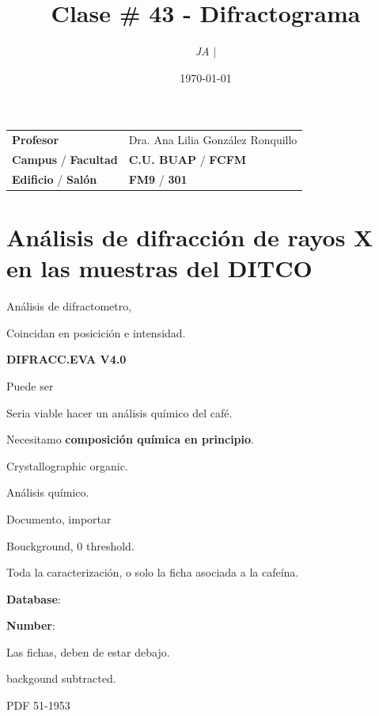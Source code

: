 \documentclass{article}
\title{Clase \# 43 - Difractograma}
\author{\emph{JA} $\boldsymbol{\mid}$}
\date{\today}
\begin{document}
\maketitle



\begin{mybox}
\noindent\begin{tabular}{@{}ll}
	{\bfseries{Profesor}} & Dra. Ana Lilia González Ronquillo\\
	\textcolor{prussianblue}{\bfseries{Campus}} / \textcolor{trueblue}{\bfseries{Facultad}}  & \textcolor{prussianblue}{\bfseries{C.U. BUAP}} /  \textcolor{trueblue}{\bfseries{FCFM}} \\
	\textcolor{prussianblue}{\bfseries{Edificio}} /  \textcolor{trueblue}{\bfseries{Salón}}    & 	\textcolor{prussianblue}{\bfseries{FM9}} /  \textcolor{trueblue}{\bfseries{301}}   
\end{tabular} 
\end{mybox} \vspace{1cm}

\tableofcontents

\vspace{2cm}


\section{Análisis de difracción de rayos X en las muestras del DITCO}


Análisis de difractometro,


Coincidan en posicición e intensidad.

\textbf{DIFRACC.EVA V4.0}

Puede ser 


Seria viable hacer un análisis químico del café.

Necesitamo \textbf{composición química en principio}.

Crystallographic organic.

Análisis químico. 

Documento, importar

Bouckground, 0 threshold.

Toda la caracterización, o solo la ficha asociada a la cafeína.

\textbf{Database}:

\textbf{Number}:


Las fichas, deben de estar debajo. 

backgound subtracted.

PDF 51-1953



 
\end{document}
